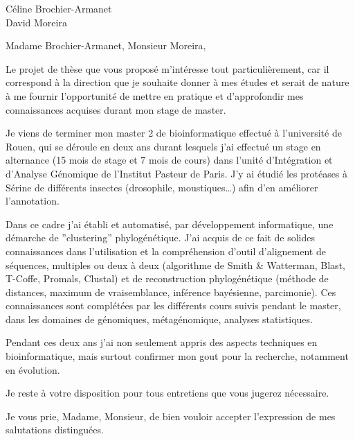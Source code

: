 \documentclass[11pt]{letter}
\date{24 juillet 2009}
\makeatletter
\newcommand*{\NoRule}{\renewcommand*{\rule@length}{0}}
\makeatother
\begin{document}
\begin{letter}{Céline Brochier-Armanet \\ David Moreira}
\NoRule
	\opening{Madame Brochier-Armanet, Monsieur Moreira,}

	Le projet de thèse que vous proposé m'intéresse tout particulièrement, car il
  correspond à la direction que je souhaite donner à mes études et serait de
  nature à me fournir l'opportunité de mettre en pratique et d'approfondir mes
  connaissances acquises durant mon stage de master.

  Je viens de terminer mon master 2 de bioinformatique effectué à l'université
  de Rouen, qui se déroule en deux ans durant lesquels j'ai effectué un stage
  en alternance (15 mois de stage et 7 mois de cours) dans l'unité
  d'Intégration et d'Analyse Génomique de l'Institut Pasteur de Paris. J'y ai
  étudié les protéases à Sérine de différents insectes (drosophile,
  moustiques\ldots) afin d'en améliorer l'annotation.

	Dans ce cadre j'ai établi et automatisé, par développement informatique, une
	démarche de ''clustering'' phylogénétique. J'ai acquis de ce fait de solides
	connaissances dans l'utilisation et la compréhension d'outil d'alignement de
	séquences, multiples ou deux à deux (algorithme de Smith \& Watterman, Blast,
	T-Coffe, Promals, Clustal) et de reconstruction phylogénétique (méthode de
	distances, maximum de vraisemblance, inférence bayésienne, parcimonie). Ces
	connaissances sont complétées par les différents cours suivis pendant le master, dans
	les domaines de génomiques, métagénomique, analyses statistiques.


	 Pendant ces deux ans j'ai non seulement appris des aspects techniques en
	 bioinformatique, mais surtout confirmer mon  gout pour la recherche,
   notamment en évolution.


  Je reste à votre disposition pour tous entretiens que vous
  jugerez nécessaire.


	\closing{Je vous prie, Madame, Monsieur, de bien vouloir accepter
	l'expression de mes salutations distinguées.} 
\end{letter}
\end{document}
